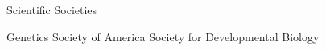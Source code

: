 \begin{rubric}{Scientific Societies}

\entry*[2014--Present]
  Genetics Society of America
\entry*[2015--Present]
  Society for Developmental Biology

\end{rubric}

